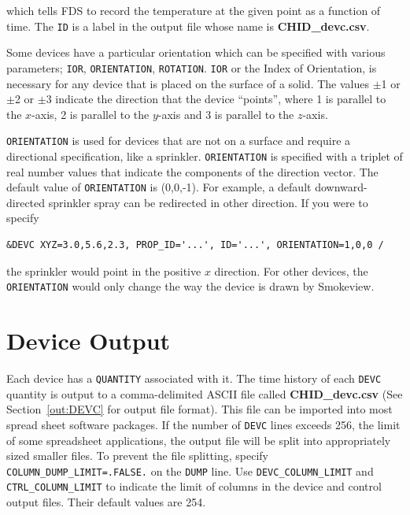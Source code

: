 \documentclass[11pt]{book}
\newcommand{\ct}{\tt\small}
\begin{document}
\noindent
which tells FDS to record the temperature at the given point as a function of time. The {\ct ID} is a label in the output file whose name
is {\bf CHID\_devc.csv}.

Some devices have a particular orientation which can be specified
with various parameters; {\ct IOR}, {\ct ORIENTATION}, {\ct ROTATION}.
{\ct IOR} or the Index of Orientation, is necessary for any device that is
placed on the surface of a solid. The values $\pm$1 or $\pm$2 or $\pm$3 indicate the direction
that the device ``points'', where 1 is parallel to the $x$-axis, 2 is parallel to the $y$-axis
and 3 is parallel to the $z$-axis.

{\ct ORIENTATION} is used for devices that are not on a surface
and require a directional specification, like a sprinkler. {\ct ORIENTATION} is specified with a
triplet of real number values that indicate the components of the direction vector.
The default value of {\ct ORIENTATION} is (0,0,-1).
For example, a default downward-directed sprinkler spray can be redirected in other direction.
If you were to specify

\footnotesize
\begin{verbatim}
&DEVC XYZ=3.0,5.6,2.3, PROP_ID='...', ID='...', ORIENTATION=1,0,0 /
\end{verbatim}
\normalsize

\noindent
the sprinkler would point in the positive $x$ direction.
For other devices, the {\ct ORIENTATION} would only change the way the device is drawn by Smokeview.



\section{Device Output}
\label{info:out:DEVC}

Each device has a {\ct QUANTITY} associated with it.
The time history of each {\ct DEVC} quantity is output to a comma-delimited
ASCII file called {\bf CHID\_devc.csv}
(See Section~\ref{out:DEVC} for output file format).
This file can be imported into most spread sheet software packages.
If the number of {\ct DEVC} lines exceeds 256, the limit of some spreadsheet
applications, the output file will be split into appropriately sized smaller
files. To prevent the file splitting, specify {\ct COLUMN\_DUMP\_LIMIT=.FALSE.} on the {\ct DUMP} line.
Use {\ct DEVC\_COLUMN\_LIMIT} and {\ct CTRL\_COLUMN\_LIMIT} to indicate the limit of columns in the
device and control output files. Their default values are 254.
\end{document}
